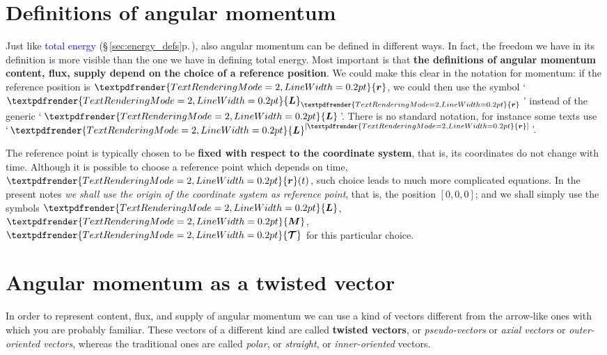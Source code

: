 \documentclass[a4paper,12pt,%
onecolumn,oneside,%
british%
]{memoir}
\renewcommand*{\bm}[1]{\textpdfrender{TextRenderingMode=2,LineWidth=0.2pt}{\boldsymbol{#1}}}
\renewcommand*{\|}[1][]{\nonscript\:#1\vert\nonscript\:\mathopen{}}
\newcommand*{\sect}{\S}%
\renewcommand*{\autoref}[3][\sect\,\ref]{\textcolor{blue}{#3} {\color{blue}\scriptsize(\faIcon[regular]{eye}\;#1{#2}\;p.\,\pageref{#2})}}
\newcommand*{\yr}{\bm{r}}
\newcommand*{\yL}{\bm{L}}%
\newcommand*{\ytoo}{\mathcal{T}}%
\newcommand*{\yto}{\bm{\ytoo}}%
\newcommand*{\yM}{\bm{M}}%
\begin{document}
\section{Definitions of angular momentum}
\label{sec:angmomentum_defs}

Just like \autoref{sec:energy_defs}{total energy}, also angular momentum can be defined in different ways. In fact, the freedom we have in its definition is more visible than the one we have in defining total energy. Most important is that \textbf{the definitions of angular momentum content, flux, supply depend on the choice of a reference position}. We could make this clear in the notation for momentum: if the reference position is $\yr$, we could then use the symbol \enquote*{\,$\yL_{\yr}$\,} instead of the generic \enquote*{\,$\yL$\,}. There is no standard notation, for instance some texts use \enquote*{\,$\yL^{[\yr]}$\,}.

The reference point is typically chosen to be \textbf{fixed with respect to the coordinate system}, that is, its coordinates do not change with time. Although it is possible to choose a reference point which depends on time, $\yr(t)$, such choice leads to much more complicated equations. In the present notes \emph{we shall use the origin of the coordinate system as reference point}, that is, the position $[0, 0, 0]$; and we shall simply use the symbols $\yL$, $\yM$, $\yto$ for this particular choice.


\section{Angular momentum as a twisted vector}
\label{sec:twisted_vec}

In order to represent content, flux, and supply of angular momentum we can use a kind of vectors different from the arrow-like ones with which you are probably familiar. These vectors of a different kind are called \textbf{twisted vectors}, or \emph{pseudo-vectors} or \emph{axial vectors} or \emph{outer-oriented vectors}, whereas the traditional ones are called  \emph{polar}, or \emph{straight}, or \emph{inner-oriented} vectors.
\end{document}
